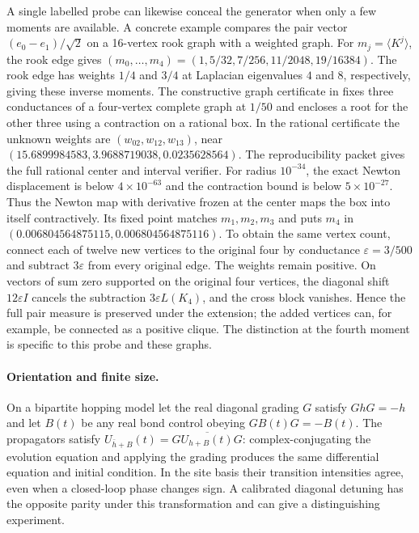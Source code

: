 \documentclass[11pt,letterpaper]{article}
\begin{document}
A single labelled probe can likewise conceal the generator when only a few moments are available. A concrete example compares the pair vector $(e_0-e_1)/\sqrt2$ on a 16-vertex rook graph with a weighted graph. For $m_j=\langle K^j\rangle$, the rook edge gives $(m_0,\ldots,m_4)=(1,5/32,7/256,11/2048,19/16384)$. The rook edge has weights $1/4$ and $3/4$ at Laplacian eigenvalues $4$ and $8$, respectively, giving these inverse moments. The constructive graph certificate in \cite{graphcert} fixes three conductances of a four-vertex complete graph at $1/50$ and encloses a root for the other three using a contraction on a rational box. In the rational certificate the unknown weights are $(w_{02},w_{12},w_{13})$, near $(15.6899984583,3.9688719038,0.0235628564)$. The reproducibility packet gives the full rational center and interval verifier. For radius $10^{-34}$, the exact Newton displacement is below $4\times10^{-63}$ and the contraction bound is below $5\times10^{-27}$. Thus the Newton map with derivative frozen at the center maps the box into itself contractively. Its fixed point matches $m_1,m_2,m_3$ and puts $m_4$ in $(0.006804564875115,0.006804564875116)$. To obtain the same vertex count, connect each of twelve new vertices to the original four by conductance $\varepsilon=3/500$ and subtract $3\varepsilon$ from every original edge. The weights remain positive. On vectors of sum zero supported on the original four vertices, the diagonal shift $12\varepsilon I$ cancels the subtraction $3\varepsilon L(K_4)$, and the cross block vanishes. Hence the full pair measure is preserved under the extension; the added vertices can, for example, be connected as a positive clique. The distinction at the fourth moment is specific to this probe and these graphs.

\paragraph{Orientation and finite size.}
On a bipartite hopping model let the real diagonal grading $G$ satisfy $GhG=-h$ and let $B(t)$ be any real bond control obeying $GB(t)G=-B(t)$. The propagators satisfy $U_{\bar h+B}(t)=G\overline{U_{h+B}(t)}G$: complex-conjugating the evolution equation and applying the grading produces the same differential equation and initial condition. In the site basis their transition intensities agree, even when a closed-loop phase changes sign. A calibrated diagonal detuning has the opposite parity under this transformation and can give a distinguishing experiment.
\end{document}
